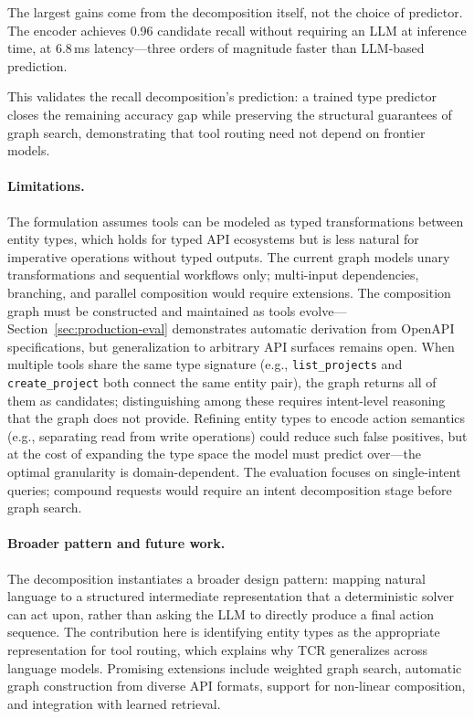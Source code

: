 The largest gains come from the decomposition itself, not the choice of predictor.
The encoder achieves 0.96 candidate recall without requiring an LLM at inference time, at 6.8\,ms latency---three orders of magnitude faster than LLM-based prediction.

This validates the recall decomposition's prediction: a trained type predictor closes the remaining accuracy gap while preserving the structural guarantees of graph search, demonstrating that tool routing need not depend on frontier models.

\paragraph{Limitations.}

The formulation assumes tools can be modeled as typed transformations between entity types, which holds for typed API ecosystems but is less natural for imperative operations without typed outputs.
The current graph models unary transformations and sequential workflows only; multi-input dependencies, branching, and parallel composition would require extensions.
The composition graph must be constructed and maintained as tools evolve---Section~\ref{sec:production-eval} demonstrates automatic derivation from OpenAPI specifications, but generalization to arbitrary API surfaces remains open.
When multiple tools share the same type signature (e.g., \texttt{list\_projects} and \texttt{create\_project} both connect the same entity pair), the graph returns all of them as candidates; distinguishing among these requires intent-level reasoning that the graph does not provide.
Refining entity types to encode action semantics (e.g., separating read from write operations) could reduce such false positives, but at the cost of expanding the type space the model must predict over---the optimal granularity is domain-dependent.
The evaluation focuses on single-intent queries; compound requests would require an intent decomposition stage before graph search.

\paragraph{Broader pattern and future work.}

The decomposition instantiates a broader design pattern: mapping natural language to a structured intermediate representation that a deterministic solver can act upon, rather than asking the LLM to directly produce a final action sequence.
The contribution here is identifying entity types as the appropriate representation for tool routing, which explains why TCR generalizes across language models.
Promising extensions include weighted graph search, automatic graph construction from diverse API formats, support for non-linear composition, and integration with learned retrieval.
